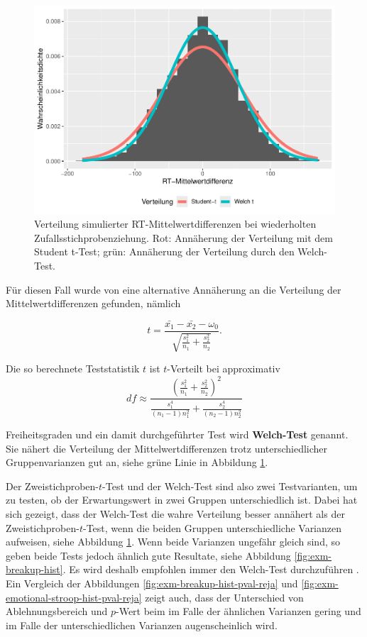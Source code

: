 \documentclass[
]{book}
\theoremstyle{definition}
\theoremstyle{definition}
\theoremstyle{definition}
\theoremstyle{definition}
\theoremstyle{remark}
\begin{document}
\begin{figure}
\centering
\includegraphics{aps_statistik1_files/figure-latex/exm-emotional-stroop-hist-1.pdf}
\caption{\label{fig:exm-emotional-stroop-hist}Verteilung simulierter RT-Mittelwertdifferenzen bei wiederholten Zufallsstichprobenziehung. Rot: Annäherung der Verteilung mit dem Student t-Test; grün: Annäherung der Verteilung durch den Welch-Test.}
\end{figure}

Für diesen Fall wurde von \citet{welch1947} eine alternative Annäherung an die Verteilung der Mittelwertdifferenzen gefunden, nämlich

\begin{equation}
t = \frac{\bar{x_1}-\bar{x_2} - \omega_0}{\sqrt{\frac{s_1^2}{n_1}+\frac{s_2^2}{n_2}}}.
\label{eq:t-emp-twosample-welch}
\end{equation}

Die so berechnete Teststatistik \(t\) ist \(t\)-Verteilt bei approximativ
\[df \approx\frac{\left(\frac{s_1^2}{n_1}+\frac{s_2^2}{n_2}\right)^2}{\frac{s_1^4}{(n_1-1) n_1^2}+ \frac{s_2^4}{(n_2-1) n_2^2}}  \]

\label{customdef-welch-test}{Freiheitsgraden und ein damit durchgeführter Test wird \textbf{Welch-Test} genannt.} Sie nähert die Verteilung der Mittelwertdifferenzen trotz unterschiedlicher Gruppenvarianzen gut an, siehe grüne Linie in Abbildung \ref{fig:exm-emotional-stroop-hist}.

Der Zweistichproben-\(t\)-Test und der Welch-Test sind also zwei Testvarianten, um zu testen, ob der Erwartungswert in zwei Gruppen unterschiedlich ist. Dabei hat sich gezeigt, dass der Welch-Test die wahre Verteilung besser annähert als der Zweistichproben-\(t\)-Test, wenn die beiden Gruppen unterschiedliche Varianzen aufweisen, siehe Abbildung \ref{fig:exm-emotional-stroop-hist}. Wenn beide Varianzen ungefähr gleich sind, so geben beide Tests jedoch ähnlich gute Resultate, siehe Abbildung \ref{fig:exm-breakup-hist}. Es wird deshalb empfohlen immer den Welch-Test durchzuführen \citep{zimmerman2004}. Ein Vergleich der Abbildungen \ref{fig:exm-breakup-hist-pval-reja} und \ref{fig:exm-emotional-stroop-hist-pval-reja} zeigt auch, dass der Unterschied von Ablehnungsbereich und \(p\)-Wert beim im Falle der ähnlichen Varianzen gering und im Falle der unterschiedlichen Varianzen augenscheinlich wird.
\end{document}
